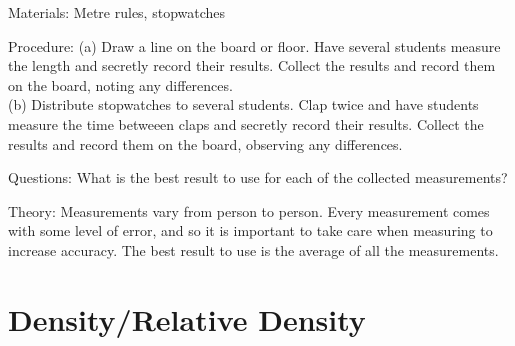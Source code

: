 \begin{multicols}{2}
\begin{description*}
\item[Materials:]{Metre rules, stopwatches}
\item[Procedure:]{(a) Draw a line on the board or floor. Have several students measure the length and secretly record their results. Collect the results and record them on the board, noting any differences.\\(b) Distribute stopwatches to several students. Clap twice and have students measure the time betweeen claps and secretly record their results. Collect the results and record them on the board, observing any differences.}
\item[Questions:]{What is the best result to use for each of the collected measurements?}
\item[Theory:]{Measurements vary from person to person. Every measurement comes with some level of error, and so it is important to take care when measuring to increase accuracy. The best result to use is the average of all the measurements.}
\end{description*}


\section*{Density/Relative Density}  




\end{multicols}
